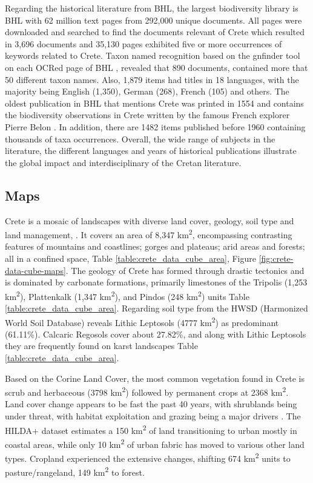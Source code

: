 \documentclass[a4paper,12pt]{article}
\begin{document}
Regarding the historical literature from BHL,
the largest biodiversity library is BHL with 62 million text pages from 292,000 unique documents. 
All pages were downloaded and searched to find the documents relevant of Crete which resulted in
3,696 documents and 35,130 pages exhibited five or more occurrences of keywords related to Crete.
Taxon named recognition based on the gnfinder tool on each OCRed page of BHL \parencite{mozzherin_gnamesgnfinder_2022},
revealed that 890 documents, contained more that 50 different taxon names.
Also, 1,879 items had titles in 18 languages, with the
majority being English (1,350), German (268), French (105) and others. 
The oldest publication in BHL that mentions Crete was printed in 1554 and contains
the biodiversity observations in Crete written by the famous French explorer Pierre Belon \parencite{belon1554les-obseruations}. 
In addition, there are 1482 items published before 1960 containing thousands of taxa occurrences.
Overall, the wide range of subjects in the literature, the different languages and years of historical publications illustrate the
global impact and interdisciplinary of the Cretan literature.

\subsection{Maps}

Crete is a mosaic of landscapes with diverse land cover, geology, soil type and land management,
 \parencite{Vogiatzakis2008_crete}. 
It covers an area of 8,347 km\textsuperscript{2}, encompassing contrasting features of
mountains and coastlines; gorges and plateaus; arid areas and forests; all in a confined space, Table \ref{table:crete_data_cube_area}, Figure \ref{fig:crete-data-cube-maps}.
The geology of Crete has formed through drastic tectonics \parencite{fassoulas1998the-structural} and is dominated by carbonate formations, primarily limestones
of the Tripolis (1,253 km\textsuperscript{2}), Plattenkalk (1,347 km\textsuperscript{2}),
and Pindos (248 km\textsuperscript{2}) units Table \ref{table:crete_data_cube_area}. 
Regarding soil type from the HWSD (Harmonized World Soil Database) reveals
Lithic Leptosols (4777 km\textsuperscript{2}) as predominant (61.11\%).
Calcaric Regosols cover about 27.82\%, and along with Lithic Leptosols 
they are frequently found on karst landscapes Table \ref{table:crete_data_cube_area}.

Based on the Corine Land Cover, the most common vegetation found in Crete is scrub and herbaceous (3798 km\textsuperscript{2}) 
followed by permanent crops at 2368 km\textsuperscript{2}. 
Land cover change appears to be fast the past 40 years, with shrublands being under threat,
with habitat exploitation and grazing being a major drivers \parencite{JouffroyBapicot2016}. 
The HILDA+ dataset \parencite{winkler2021global} estimates a 150 km\textsuperscript{2}
of land transitioning to urban mostly in coastal areas, 
while only 10 km\textsuperscript{2} of urban fabric has moved to various other land types.
Cropland experienced the extensive changes, shifting 674 km\textsuperscript{2}
units to pasture/rangeland, 149 km\textsuperscript{2} to forest.
\end{document}
